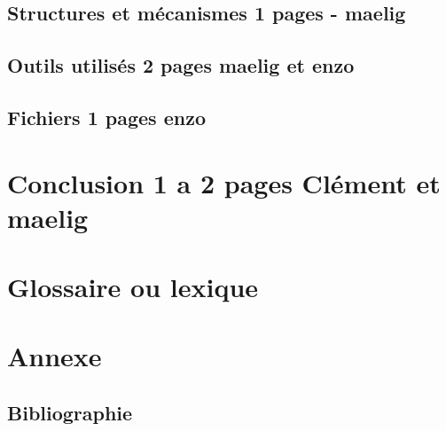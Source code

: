 \documentclass[10pt]{article}
\begin{document}
   \subsection{Structures et mécanismes 1 pages - maelig}
   \subsection{Outils utilisés 2 pages maelig et enzo}
   \subsection{Fichiers 1 pages enzo}
   
\section{Conclusion 1 a 2 pages Clément et maelig}

\section{Glossaire ou lexique}

\section{Annexe}
\subsection{Bibliographie}
\end{document}
